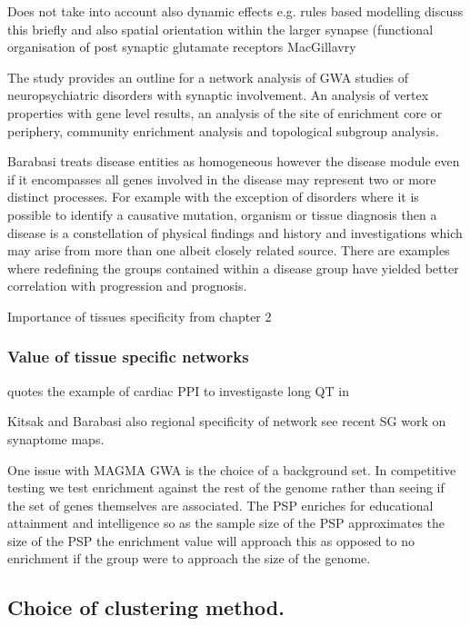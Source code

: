 Does not take into account also dynamic effects e.g. rules based modelling discuss this briefly and also spatial orientation within the larger synapse (functional organisation of post synaptic glutamate receptors MacGillavry

The study provides an outline for a network analysis of GWA studies of neuropsychiatric disorders with synaptic involvement. An analysis of vertex properties with gene level results, an analysis of the site of enrichment core or periphery, community enrichment analysis and topological subgroup analysis. 

Barabasi treats disease entities as homogeneous however the disease module even if it encompasses all genes involved in the disease may represent two or more distinct processes. For example with the exception of disorders where it is possible to identify a causative mutation, organism or tissue diagnosis then a disease is a constellation of physical findings and history and investigations which may arise from more than one albeit closely related source. There are examples where redefining the groups contained within a disease group have yielded better correlation with progression and prognosis. 

Importance of tissues specificity from chapter 2 \subsubsection{Value of tissue specific networks}
\label{sec:value_of_tissue_specific_networks}

\cite{parikshak2015systems} quotes the example of cardiac PPI to investigaste long QT in \cite{lundby2014annotation}

Kitsak and Barabasi \cite{kitsak2016tissue}
also regional specificity of network see recent SG work on synaptome maps. 

One issue with MAGMA GWA is the choice of a background set. In competitive testing we test enrichment against the rest of the genome rather than seeing if the set of genes themselves are associated. The PSP enriches for educational attainment and intelligence so as the sample size of the PSP approximates the size of the PSP the enrichment value will approach this as opposed to no enrichment if the group were to approach the size of the genome. 


\subsection{Choice of clustering method.} 

